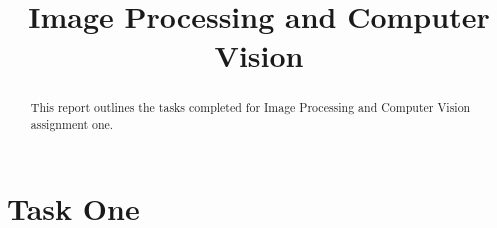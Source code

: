 \documentclass[conference]{IEEEtran}
\begin{document}
\title{Image Processing and Computer Vision\\
}


\author{
}

\maketitle

\begin{abstract}
This report outlines the tasks completed for Image Processing and Computer Vision assignment one.
\end{abstract}

\section{Task One}
\end{document}
